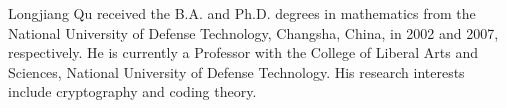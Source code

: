 \documentclass[10pt]{article}
\begin{document}
Longjiang Qu received the B.A. and Ph.D. degrees in mathematics from the National University of Defense Technology, Changsha, China, in 2002 and 2007, respectively. He is currently a Professor with the College of Liberal Arts and Sciences, National University of Defense Technology. His research interests include cryptography and coding theory.
\end{document}
